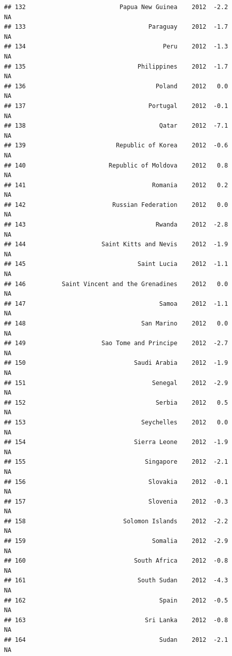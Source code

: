\documentclass[
]{book}
\begin{document}
\begin{verbatim}
## 132                          Papua New Guinea    2012  -2.2              NA
## 133                                  Paraguay    2012  -1.7              NA
## 134                                      Peru    2012  -1.3              NA
## 135                               Philippines    2012  -1.7              NA
## 136                                    Poland    2012   0.0              NA
## 137                                  Portugal    2012  -0.1              NA
## 138                                     Qatar    2012  -7.1              NA
## 139                         Republic of Korea    2012  -0.6              NA
## 140                       Republic of Moldova    2012   0.8              NA
## 141                                   Romania    2012   0.2              NA
## 142                        Russian Federation    2012   0.0              NA
## 143                                    Rwanda    2012  -2.8              NA
## 144                     Saint Kitts and Nevis    2012  -1.9              NA
## 145                               Saint Lucia    2012  -1.1              NA
## 146          Saint Vincent and the Grenadines    2012   0.0              NA
## 147                                     Samoa    2012  -1.1              NA
## 148                                San Marino    2012   0.0              NA
## 149                     Sao Tome and Principe    2012  -2.7              NA
## 150                              Saudi Arabia    2012  -1.9              NA
## 151                                   Senegal    2012  -2.9              NA
## 152                                    Serbia    2012   0.5              NA
## 153                                Seychelles    2012   0.0              NA
## 154                              Sierra Leone    2012  -1.9              NA
## 155                                 Singapore    2012  -2.1              NA
## 156                                  Slovakia    2012  -0.1              NA
## 157                                  Slovenia    2012  -0.3              NA
## 158                           Solomon Islands    2012  -2.2              NA
## 159                                   Somalia    2012  -2.9              NA
## 160                              South Africa    2012  -0.8              NA
## 161                               South Sudan    2012  -4.3              NA
## 162                                     Spain    2012  -0.5              NA
## 163                                 Sri Lanka    2012  -0.8              NA
## 164                                     Sudan    2012  -2.1              NA

\end{verbatim}
\end{document}
